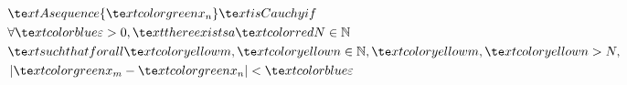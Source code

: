 \documentclass[preview]{standalone}
\begin{document}
\begin{align*}
\begin{aligned}&\te x t{A sequence } \{ \te x tcolor{green}{ x _n} \} \te x t{ is Cauchy if } \\& \forall \te x tcolor{blue}{\varepsilon} > 0, \te x t{ there e x ists a } \te x tcolor{red}{N} \in \mathbb{N} \\& \te x t{such that for all } \te x tcolor{yellow}{m}, \te x tcolor{yellow}{n} \in \mathbb{N}, \te x tcolor{yellow}{m}, \te x tcolor{yellow}{n} > N, \\& \left|\te x tcolor{green}{ x _m} - \te x tcolor{green}{ x _n} \right| < \te x tcolor{blue}{\varepsilon} \end{aligned}
\end{align*}
\end{document}
